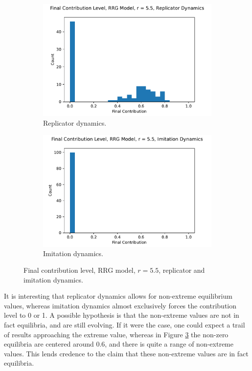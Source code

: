 \FloatBarrier 
\begin{figure}[!h]
  \begin{subfigure}[b]{0.45\textwidth}
    \includegraphics[width=1.1\textwidth]{images/Rep_coop_histo_RRG_55.pdf}
    \caption{Replicator dynamics. }
    \label{Rep_RRG_55_coop_histo}
  \end{subfigure}
  \hfill
  \begin{subfigure}[b]{0.45\textwidth}
    \includegraphics[width=1.1\textwidth]{images/ID_coop_histo_RRG_55.pdf}
    \caption{Imitation dynamics. }
    \label{ID_RRG_55_coop_histo}
  \end{subfigure}
  \caption{Final contribution level, RRG model, $r = 5.5$, replicator and imitation dynamics. } \label{coop_histo_RRG}
\end{figure} 
\FloatBarrier
 It is interesting that replicator dynamics allows for non-extreme equilibrium values, whereas imitation dynamics almost exclusively forces the contribution level to 0 or 1. A possible hypothesis is that the non-extreme values are not in fact equilibria, and are still evolving. If it were the case, one could expect a trail of results approaching the extreme value, whereas in Figure \ref{coop_histo_RRG} the non-zero equilibria are centered around 0.6, and there is quite a range of non-extreme values. This lends credence to the claim that these non-extreme values are in fact equilibria. \\
 



